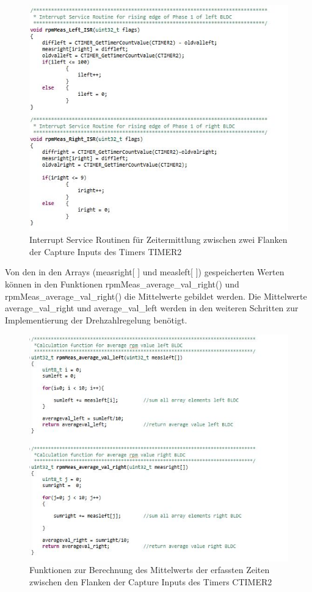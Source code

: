 \begin{figure}[H] %
\includegraphics[width=.8\textwidth]{sec4/images/isr} 
\centering
\captionsetup{width=.95\textwidth}
\caption[Interrupt Service Routinen für Zeitermittlung zwischen zwei Capture-Flanken]{Interrupt Service Routinen für Zeitermittlung zwischen zwei Flanken der Capture Inputs des Timers TIMER2}\centering
\label{fig:isr}
\end{figure}

\newpage
Von den in den Arrays (\glqq{}measright[ ]\grqq{} und \glqq{}measleft[ ]\grqq{}) gespeicherten Werten können in den Funktionen \glqq{}rpmMeas\_average\_val\_right()\grqq{} und \glqq{}rpmMeas\_average\_val\_right()\grqq{} die Mittelwerte gebildet werden. Die Mittelwerte \glqq{}average\_val\_right\grqq{} und \glqq{}average\_val\_left\grqq{} werden in den weiteren Schritten zur Implementierung der Drehzahlregelung benötigt. 

\begin{figure}[H] %
\includegraphics[width=.8\textwidth]{sec4/images/calculation} 
\centering
\captionsetup{width=.95\textwidth}
\caption[Funktionen zur Berechnung des Mittelwerts der Zeiten zwischen den Capture-Flanken]{Funktionen zur Berechnung des Mittelwerts der erfassten Zeiten zwischen den Flanken der Capture Inputs des Timers CTIMER2}\centering
\label{fig:calculation}
\end{figure}



\newpage

